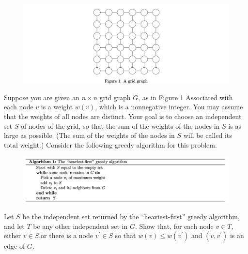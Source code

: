 \newpage
{} %

\problemdes

\begin{figure}[!ht]
    \centering
    \includegraphics[width=\textwidth]{graph.png}
    \label{fig:algo}
\end{figure}

Suppose you are given an $n \times n$ grid graph $G$, as in Figure 1 Associated with each node $v$ is a weight $w(v)$, which is a nonnegative integer. You may assume that the weights of all nodes are distinct. Your goal is to choose an independent set $S$ of nodes of the grid, so that the sum of the weights of the nodes in $S$ is as large as possible. (The sum of the weights of the nodes in $S$ will be called its total weight.) Consider the following greedy algorithm for this problem.

\begin{figure}[!ht]
    \centering
    \includegraphics[width=\textwidth]{algorithm.png}
    \label{fig:algo}
\end{figure}


Let $S$ be the independent set returned by the “heaviest-first” greedy algorithm, and let $T$ be any other independent set in $G$. Show that, for each node $v \in T$, either $v \in S$,or there is a node $v^\prime \in S$ so that $w(v) \le w(v^\prime)$ and $(v, v^\prime)$ is an edge of $G$.




